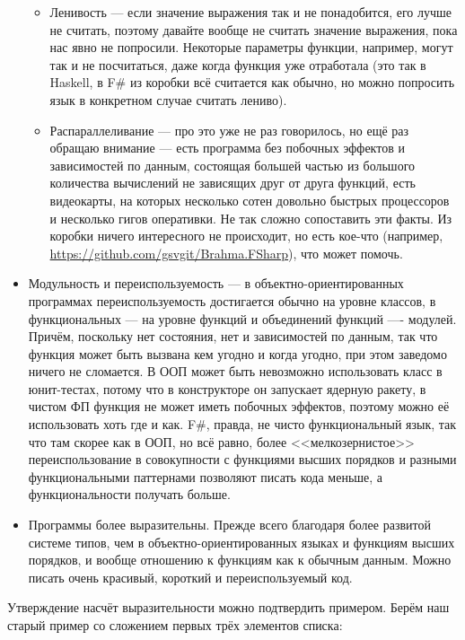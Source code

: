 \documentclass[a5paper]{article}
\begin{document}
\begin{itemize}
    \begin{itemize}
        \item Ленивость --- если значение выражения так и не понадобится, его лучше не считать, поэтому давайте вообще не считать значение выражения, пока нас явно не попросили. Некоторые параметры функции, например, могут так и не посчитаться, даже когда функция уже отработала (это так в Haskell, в F\# из коробки всё считается как обычно, но можно попросить язык в конкретном случае считать лениво).
        \item Распараллеливание --- про это уже не раз говорилось, но ещё раз обращаю внимание --- есть программа без побочных эффектов и зависимостей по данным, состоящая большей частью из большого количества вычислений не зависящих друг от друга функций, есть видеокарты, на которых несколько сотен довольно быстрых процессоров и несколько гигов оперативки. Не так сложно сопоставить эти факты. Из коробки ничего интересного не происходит, но есть кое-что (например, \url{https://github.com/gsvgit/Brahma.FSharp}), что может помочь.
    \end{itemize}
    \item Модульность и переиспользуемость --- в объектно-ориентированных программах переиспользуемость достигается обычно на уровне классов, в функциональных --- на уровне функций и объединений функций ---- модулей. Причём, поскольку нет состояния, нет и зависимостей по данным, так что функция может быть вызвана кем угодно и когда угодно, при этом заведомо ничего не сломается. В ООП может быть невозможно использовать класс в юнит-тестах, потому что в конструкторе он запускает ядерную ракету, в чистом ФП функция не может иметь побочных эффектов, поэтому можно её использовать хоть где и как. F\#, правда, не чисто функциональный язык, так что там скорее как в ООП, но всё равно, более <<мелкозернистое>> переиспользование в совокупности с функциями высших порядков и разными функциональными паттернами позволяют писать кода меньше, а функциональности получать больше.
    \item Программы более выразительны. Прежде всего благодаря более развитой системе типов, чем в объектно-ориентированных языках и функциям высших порядков, и вообще отношению к функциям как к обычным данным. Можно писать очень красивый, короткий и переиспользуемый код.
\end{itemize}

Утверждение насчёт выразительности можно подтвердить примером. Берём наш старый пример со сложением первых трёх элементов списка:
\end{document}
